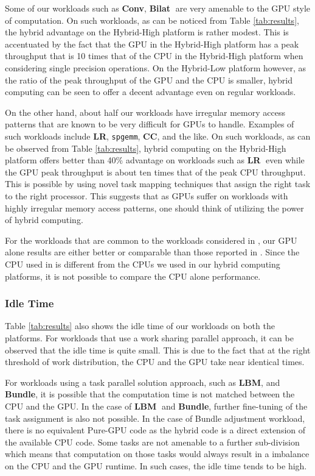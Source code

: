 \documentclass[11pt]{article}
\newcommand{\sgemm} {{\tt spgemm}}
\newcommand{\bilat} {{\bf Bilat}}
\newcommand{\conv} {{\bf Conv}}
\newcommand{\LR} {{\bf LR}}
\newcommand{\CC} {{\bf CC}}
\newcommand{\Bundle} {{\bf Bundle}}
\newcommand{\LBM} {{\bf LBM}}
\begin{document}
Some of our workloads such as  \conv, \bilat$\;$ are
very amenable to the GPU style of computation. On such workloads, as can
be noticed from Table \ref{tab:results}, the hybrid advantage on the
Hybrid-High platform is rather modest. This is accentuated by the fact that
the GPU in the Hybrid-High platform has a peak throughput that is 10 times
that of the CPU in the Hybrid-High platform when considering single
precision operations.  On the Hybrid-Low
platform however, as the ratio of the peak throughput of the GPU and the
CPU is smaller, hybrid computing can be seen to offer a decent advantage
even on regular workloads.


On the other hand, about half our workloads have irregular memory access
patterns that are
known to be very difficult for GPUs to handle. Examples of such workloads
include \LR, \sgemm, \CC, and the like. 
On such workloads, as can be observed from Table \ref{tab:results}, hybrid
computing on the Hybrid-High platform offers better than 40\% advantage on 
workloads such as \LR$\;$ even while the GPU peak throughput is 
about ten times that of the peak CPU throughput.
This is possible by using novel task mapping techniques
that assign the right task to the right processor. This suggests that as
GPUs suffer on workloads with highly irregular memory access patterns,
one should think of utilizing the power of hybrid computing. 

For the workloads that are common to the workloads considered in
\cite{isca10}, our GPU alone results are either better or comparable than
those reported in \cite{isca10}. Since the CPU used in \cite{isca10} is
different from the CPUs we used in our hybrid computing platforms, it is not
possible to compare the CPU alone performance. 

\subsubsection{Idle Time}
Table \ref{tab:results} also shows the idle time of our workloads on
both the platforms. For workloads that use a work sharing parallel
approach, it can be observed that the idle time is quite small. 
This is due to the fact that at the right threshold of work
distribution, the CPU and the GPU  take near identical times. 

For workloads using a task parallel solution approach, such as \LBM,
and \Bundle, it is possible that the computation time is not matched
between the CPU and the GPU. In the case of \LBM$\;$ and \Bundle, further
fine-tuning of the task assignment is also not possible. In the
case of Bundle adjustment workload, there is no equivalent Pure-GPU code as
the hybrid code is a direct extension of the available CPU code.
 Some tasks are
not amenable to a further sub-division which means that computation on those
tasks would always result in a imbalance on the CPU and the GPU runtime.
In such cases, the idle time tends to be high. 
\end{document}
